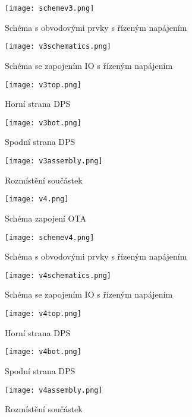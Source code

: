 \begin{figure}[h]
\centering
\texttt{[image: schemev3.png]}
\caption[]{Schéma s obvodovými prvky s řízeným napájením}
\end{figure}
\begin{figure}[h]
\centering
\texttt{[image: v3schematics.png]}
\caption[]{Schéma se zapojením IO s řízeným napájením}
\end{figure}
\begin{figure}[h]
\centering
\texttt{[image: v3top.png]}
\caption[]{Horní strana DPS}
\end{figure}
\begin{figure}[h]
\centering
\texttt{[image: v3bot.png]}
\caption[]{Spodní strana DPS}
\end{figure}
\begin{figure}[h]
\centering
\texttt{[image: v3assembly.png]}
\caption[]{Rozmístění součástek}
\end{figure}
\begin{figure}[h]
\centering
\texttt{[image: v4.png]}
\caption[]{Schéma zapojení OTA}
\end{figure}
\begin{figure}[h]
\centering
\texttt{[image: schemev4.png]}
\caption[]{Schéma s obvodovými prvky s řízeným napájením}
\end{figure}
\begin{figure}[h]
\centering
\texttt{[image: v4schematics.png]}
\caption[]{Schéma se zapojením IO s řízeným napájením}
\end{figure}
\begin{figure}[h]
\centering
\texttt{[image: v4top.png]}
\caption[]{Horní strana DPS}
\end{figure}
\begin{figure}[h]
\centering
\texttt{[image: v4bot.png]}
\caption[]{Spodní strana DPS}
\end{figure}
\begin{figure}[h]
\centering
\texttt{[image: v4assembly.png]}
\caption[]{Rozmístění součástek}
\end{figure}